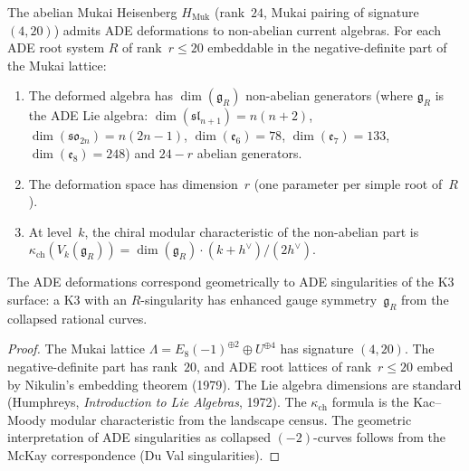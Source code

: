 \begin{proposition}
\label{prop:ade-deformations-mukai}
The abelian Mukai Heisenberg $H_{\mathrm{Muk}}$ (rank~$24$, Mukai pairing of signature~$(4, 20)$) admits ADE deformations to non-abelian current algebras. For each ADE root system $R$ of rank~$r \leq 20$ embeddable in the negative-definite part of the Mukai lattice:
\begin{enumerate}[label=\textup{(\roman*)}]
 \item The deformed algebra has $\dim(\mathfrak{g}_R)$ non-abelian generators (where $\mathfrak{g}_R$ is the ADE Lie algebra: $\dim(\mathfrak{sl}_{n+1}) = n(n+2)$, $\dim(\mathfrak{so}_{2n}) = n(2n-1)$, $\dim(\mathfrak{e}_6) = 78$, $\dim(\mathfrak{e}_7) = 133$, $\dim(\mathfrak{e}_8) = 248$) and $24 - r$ abelian generators.
 \item The deformation space has dimension~$r$ (one parameter per simple root of~$R$).
 \item At level~$k$, the chiral modular characteristic of the non-abelian part is $\kappa_{\mathrm{ch}}(V_k(\mathfrak{g}_R)) = \dim(\mathfrak{g}_R) \cdot (k + h^\vee) / (2h^\vee)$.
\end{enumerate}
The ADE deformations correspond geometrically to ADE singularities of the K3 surface: a K3 with an $R$-singularity has enhanced gauge symmetry~$\mathfrak{g}_R$ from the collapsed rational curves.
\end{proposition}

\begin{proof}
The Mukai lattice $\Lambda = E_8(-1)^{\oplus 2} \oplus U^{\oplus 4}$ has signature $(4, 20)$. The negative-definite part has rank~$20$, and ADE root lattices of rank~$r \leq 20$ embed by Nikulin's embedding theorem (1979). The Lie algebra dimensions are standard (Humphreys, \emph{Introduction to Lie Algebras}, 1972). The $\kappa_{\mathrm{ch}}$ formula is the Kac--Moody modular characteristic from the landscape census. The geometric interpretation of ADE singularities as collapsed $(-2)$-curves follows from the McKay correspondence (Du Val singularities).
\end{proof}

